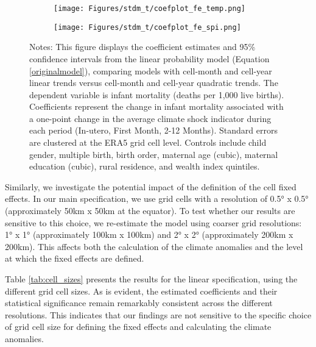 \documentclass[a4paper]{article}
\begin{document}
\begin{figure}[t!]
    \caption{Does different fixed effects change the results?}
    \label{fig:quad_time_trend}
    \begin{center}
    \begin{subfigure}[t]{0.49\textwidth}
        \centering
        \texttt{[image: Figures/stdm\_t/coefplot\_fe\_temp.png]}
    \end{subfigure}%
    \begin{subfigure}[t]{0.49\textwidth}
        \centering
        \texttt{[image: Figures/stdm\_t/coefplot\_fe\_spi.png]}
    \end{subfigure}
    \end{center}
    \footnotesize{Notes: This figure displays the coefficient estimates and 95\% confidence intervals from the linear probability model (Equation \ref{originalmodel}), comparing models with cell-month and cell-year linear trends versus cell-month and cell-year quadratic trends. The dependent variable is infant mortality (deaths per 1,000 live births). Coefficients represent the change in infant mortality associated with a one-point change in the average climate shock indicator during each period (In-utero, First Month, 2-12 Months). Standard errors are clustered at the ERA5 grid cell level. Controls include child gender, multiple birth, birth order, maternal age (cubic), maternal education (cubic), rural residence, and wealth index quintiles.}
\end{figure}

Similarly, we investigate the potential impact of the definition of the cell fixed effects.  In our main specification, we use grid cells with a resolution of 0.5° x 0.5° (approximately 50km x 50km at the equator).  To test whether our results are sensitive to this choice, we re-estimate the model using coarser grid resolutions: 1° x 1° (approximately 100km x 100km) and 2° x 2° (approximately 200km x 200km).  This affects both the calculation of the climate anomalies and the level at which the fixed effects are defined.

Table \ref{tab:cell_sizes} presents the results for the linear specification, using the different grid cell sizes.  As is evident, the estimated coefficients and their statistical significance remain remarkably consistent across the different resolutions. This indicates that our findings are not sensitive to the specific choice of grid cell size for defining the fixed effects and calculating the climate anomalies.
\end{document}
